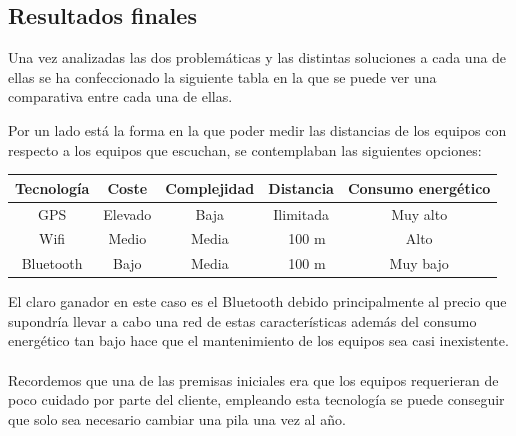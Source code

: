 \documentclass[paper=a4, fontsize=11pt,twoside]{scrartcl}	%
\begin{document}
    \subsection{Resultados finales}
        Una vez analizadas las dos problemáticas y las distintas soluciones a cada una de ellas se ha confeccionado la siguiente tabla 
        en la que se puede ver una comparativa entre cada una de ellas.

        Por un lado está la forma en la que poder medir las distancias de los equipos con respecto a los equipos que escuchan,
        se contemplaban las siguientes opciones:
        \begin{center}
            \begin{tabular}{|c | c| c| c| c |} 
            \hline
            Tecnología  & Coste  & Complejidad & Distancia & Consumo energético \\ [0.5ex] 
            \hline
            GPS& Elevado& Baja & Ilimitada& Muy alto\\
            Wifi& Medio& Media & ~ 100 m & Alto\\ 
            Bluetooth& Bajo& Media & ~ 100 m & Muy bajo\\ 
            \hline
            \end{tabular}
        \end{center}   
        El claro ganador en este caso es el Bluetooth debido principalmente al precio que supondría llevar a cabo una red de estas 
        características además del consumo energético tan bajo hace que el mantenimiento de los equipos sea casi inexistente.
        \paragraph{}
        Recordemos que una de las premisas iniciales era que los equipos requerieran de poco cuidado por parte del cliente, empleando
        esta tecnología se puede conseguir que solo sea necesario cambiar una pila una vez al año.
\end{document}
